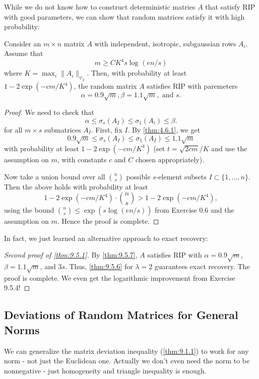 While we do not know how to construct deterministic matries $A$ that satisfy RIP with good parameters, we can 
show that random matrices satisfy it with high probability:

\begin{theorem}
\label{thm:9.5.7}
Consider an $m \times n$ matrix $A$ with independent, isotropic, subgaussian rows $A_i$. Assume that 
\[ m \geq CK^4 s \log_{}{(en/s)} \]
where $K = \max_{i} \lVert A_i \rVert_{\psi_2}$. Then, with probability at least $1 - 2 \exp{(-cm/K^4)}$, 
the random matrix $A$ satisfies RIP with paremeters 
\[ \alpha = 0.9 \sqrt{m}, \beta = 1.1 \sqrt{m}, \text{ and } s. \]
\end{theorem}

\begin{proof}
We need to check that 
\[ \alpha \leq \sigma_s(A_I) \leq \sigma_1(A_i) \leq \beta. \]
for all $m \times s$ submatrices $A_I$. First, fix $I$. By \cref{thm:4.6.1}, we get 
\[ 0.9 \sqrt{m} \leq \sigma_s(A_I) \leq \sigma_1(A_I) \leq 1.1 \sqrt{m} \]
with probability at least $1 - 2 \exp{(-cm/K^4)}$ (set $t = \sqrt{2cm}/K$ and use the assumption on $m$, 
with constants $c$ and $C$ chosen appropriately).

Now take a union bound over all $\binom{n}{s}$ possible $s$-element subsets $I \subset \{ 1, \dots, n \}$. 
Then the above holds with probability at least 
\[ 1 - 2 \exp{(-cm/K^4)} \cdot \binom{n}{s} > 1 - 2 \exp{(-cm/K^4)}, \]
using the bound $\binom{n}{s} \leq \exp{(s \log_{}{(en/s)})}$ from Exercise 0.6 and the assumption on $m$. 
Hence the proof is complete.
\end{proof}

In fact, we just learned an alternative approach to exact recovery:

\begin{proof}[Second proof of \cref{thm:9.5.1}]
By \cref{thm:9.5.7}, $A$ satisfies RIP with $\alpha = 0.9 \sqrt{m}$, $\beta = 1.1 \sqrt{m}$, and $3s$. Thus, 
\cref{thm:9.5.6} for $\lambda = 2$ guarantees exact recovery. The proof is complete. We even get the 
logarithmic improvement from Exercise 9.5.4!
\end{proof}



\subsection{Deviations of Random Matrices for General Norms}
We can generalize the matrix deviation inequality (\cref{thm:9.1.1}) to work for any norm - not just the 
Euclidean one. Actually we don't even need the norm to be nonnegative - just homogeneity and triangle inequality 
is enough.

